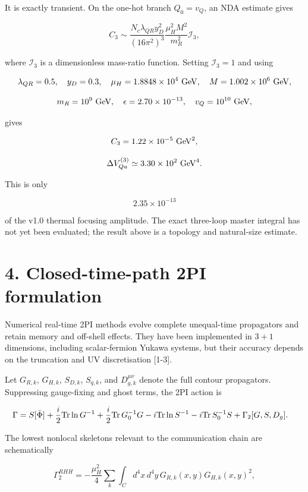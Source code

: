 \documentclass[
  10pt,
]{article}
\begin{document}
It is exactly transient. On the one-hot branch \(Q_0=v_Q\), an NDA
estimate gives

\[
C_3
\sim
\frac{N_c\lambda_{QR}y_D^2}{(16\pi^2)^3}
\frac{\mu_H^2M^2}{m_R^2}\mathcal I_3,
\]

where \(\mathcal I_3\) is a dimensionless mass-ratio function. Setting
\(\mathcal I_3=1\) and using

\[
\lambda_{QR}=0.5,
\quad y_D=0.3,
\quad \mu_H=1.8848\times10^4\ {\rm GeV},
\quad M=1.002\times10^6\ {\rm GeV},
\]

\[
m_R=10^9\ {\rm GeV},
\quad \epsilon=2.70\times10^{-13},
\quad v_Q=10^{10}\ {\rm GeV},
\]

gives

\[
C_3=1.22\times10^{-5}\ {\rm GeV}^2,
\]

\[
\Delta V_{Qa}^{(3)}\simeq3.30\times10^2\ {\rm GeV}^4.
\]

This is only

\[
2.35\times10^{-13}
\]

of the v1.0 thermal focusing amplitude. The exact three-loop master
integral has not yet been evaluated; the result above is a topology and
natural-size estimate.

\section{4. Closed-time-path 2PI
formulation}\label{closed-time-path-2pi-formulation}

Numerical real-time 2PI methods evolve complete unequal-time propagators
and retain memory and off-shell effects. They have been implemented in
\(3+1\) dimensions, including scalar-fermion Yukawa systems, but their
accuracy depends on the truncation and UV discretisation {[}1-3{]}.

Let \(G_{R,k}\), \(G_{H,k}\), \(S_{D,k}\), \(S_{q,k}\), and
\(D_{g,k}^{\mu\nu}\) denote the full contour propagators. Suppressing
gauge-fixing and ghost terms, the 2PI action is

\[
\begin{aligned}
\Gamma
={}&S[\bar\Phi]
+\frac i2{\rm Tr}\ln G^{-1}
+\frac i2{\rm Tr}\,G_0^{-1}G
-i{\rm Tr}\ln S^{-1}
-i{\rm Tr}\,S_0^{-1}S
+\Gamma_2[G,S,D_g].
\end{aligned}
\]

The lowest nonlocal skeletons relevant to the communication chain are
schematically

\[
\Gamma_2^{RHH}
=
-\frac{\mu_H^2}{4}
\sum_k\int_Cd^4x\,d^4y\,
G_{R,k}(x,y)G_{H,k}(x,y)^2,
\]
\end{document}
